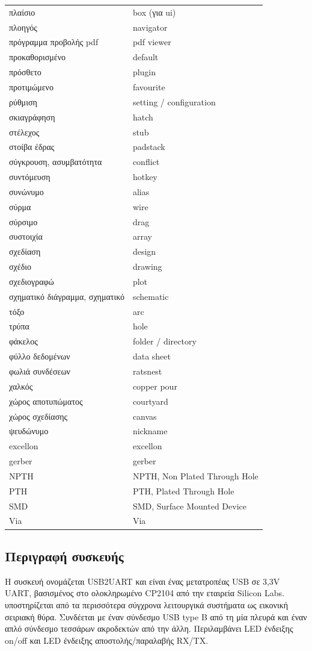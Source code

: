 \documentclass[a4paper]{article}
\begin{document}
\begin{longtabu}{ l l }
    πλαίσιο	&	box (για ui)	\\
    πλοηγός	&	navigator	\\
    πρόγραμμα προβολής pdf	&	pdf viewer	\\
    προκαθορισμένο	&	default	\\
    πρόσθετο	&	plugin	\\
    προτιμώμενο	&	favourite	\\
    ρύθμιση	&	setting / configuration	\\
    σκιαγράφηση	&	hatch	\\
    στέλεχος	&	stub	\\
    στοίβα έδρας	&	padstack	\\
    σύγκρουση, ασυμβατότητα	&	conflict	\\
    συντόμευση	&	hotkey	\\
    συνώνυμο	&	alias	\\
    σύρμα	&	wire	\\
    σύρσιμο	&	drag	\\
    συστοιχία	&	array	\\
    σχεδίαση	&	design	\\
    σχέδιο	&	drawing	\\
    σχεδιογραφώ	&	plot	\\
    σχηματικό διάγραμμα, σχηματικό	&	schematic	\\
    τόξο	&	arc	\\
    τρύπα	&	hole	\\
    φάκελος	&	folder / directory	\\
    φύλλο δεδομένων	&	data sheet	\\
    φωλιά συνδέσεων	&	ratsnest	\\
    χαλκός	&	copper pour	\\
    χώρος αποτυπώματος	&	courtyard	\\
    χώρος σχεδίασης	&	canvas	\\
    ψευδώνυμο	&	nickname	\\
    excellon	&	excellon	\\
    gerber	&	gerber	\\
    NPTH	&	NPTH, Non Plated Through Hole	\\
    PTH	&	PTH, Plated Through Hole  \\
    SMD	&	SMD, Surface Mounted Device	\\
    Via	&	Via	\\
\end{longtabu}

\subsection{Περιγραφή συσκευής}
Η συσκευή ονομάζεται USB2UART και είναι ένας μετατροπέας USB σε 3,3V UART, βασισμένος στο ολοκληρωμένο CP2104 από την εταιρεία Silicon Labs. υποστηρίζεται από τα περισσότερα σύγχρονα λειτουργικά συστήματα ως εικονική σειριακή θύρα. Συνδέεται με έναν σύνδεσμο USB type B από τη μία πλευρά και έναν απλό σύνδεσμο τεσσάρων ακροδεκτών από την άλλη. Περιλαμβάνει LED ένδειξης on/off και LED ένδειξης αποστολής/παραλαβής RX/TX.
\end{document}
